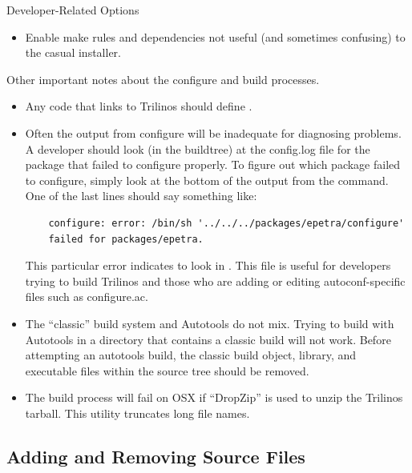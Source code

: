 \documentclass[12pt,relax]{TrilinosDevGuide}
\begin{document}
Developer-Related Options
\begin{itemize}
\item {}

Enable make rules and dependencies not useful (and sometimes confusing) to 
the casual installer.
\end{itemize}

Other important notes about the configure and build processes.
\begin{itemize}
\item Any code that links to Trilinos should define 
.

\item Often the output from configure will be inadequate for diagnosing 
problems.  A developer should look (in the buildtree) at the config.log file 
for the package that failed to configure properly.  To figure out which 
package failed to configure, simply look at the bottom of the output from the 
 command.  One of the last lines should say something 
like:

\begin{verbatim}
    configure: error: /bin/sh '../../../packages/epetra/configure' 
    failed for packages/epetra.
\end{verbatim}

This particular error indicates to look in 
.  This file is useful for 
developers trying to build Trilinos and those who are 
adding or editing autoconf-specific files such as configure.ac.

\item The ``classic'' build system and Autotools do not mix.  Trying to build 
with Autotools in a directory that contains a classic build will not work.  
Before attempting an autotools build, the classic build object, library, and 
executable files within the source tree should be removed.

\item The build process will fail on OSX if ``DropZip'' is used to 
unzip the Trilinos tarball.  This utility truncates long file names.

\end{itemize}

\subsection{Adding and Removing Source Files}
\label{Subsection:AddSource}
\end{document}
